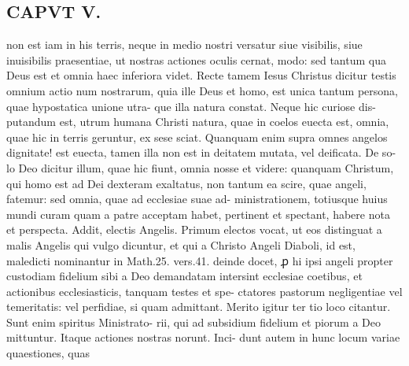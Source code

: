 \documentclass{article}
\begin{document}
\begin{pages}
\section*{CAPVT  V. }
\marginpar{[ p.3 ]}non est iam in his terris, neque in medio nostri versatur siue visibilis, siue inuisibilis praesentiae, ut nostras actiones oculis cernat, modo: sed tantum qua Deus est et omnia haec inferiora videt. Recte tamem Iesus Christus dicitur testis omnium actio num nostrarum, quia ille Deus et homo, est unica tantum persona, quae hypostatica unione utra- que illa natura constat. Neque hic curiose dis- putandum est, utrum humana Christi natura, quae in coelos euecta est, omnia, quae hic in terris geruntur, ex sese sciat. Quanquam enim supra omnes angelos dignitate! est euecta, tamen illa non est in deitatem mutata, vel deificata. De so- lo Deo dicitur illum, quae hic fiunt, omnia nosse et videre: quanquam Christum, qui homo est ad Dei dexteram exaltatus, non tantum ea scire, quae angeli, fatemur: sed omnia, quae ad ecclesiae suae ad- ministrationem, totiusque huius mundi curam quam a patre acceptam habet, pertinent et spectant, habere nota et perspecta. Addit, electis Angelis. Primum electos vocat, ut eos distinguat a malis Angelis qui vulgo dicuntur, et qui a Christo Angeli Diaboli, id est, maledicti nominantur in Math.25. vers.41. deinde docet, ꝓ hi ipsi angeli propter custodiam fidelium sibi a Deo demandatam intersint ecclesiae coetibus, et actionibus ecclesiasticis, tanquam testes et spe- ctatores pastorum negligentiae vel temeritatis: vel perfidiae, si quam admittant. Merito igitur ter tio loco citantur. Sunt enim spiritus Ministrato- rii, qui ad subsidium fidelium et piorum a Deo mittuntur. Itaque actiones nostras norunt. Inci- dunt autem in hunc locum variae quaestiones, quas 

\end{pages}
\end{document}
